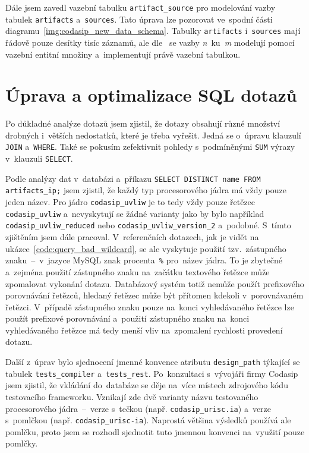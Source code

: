 Dále jsem zavedl vazební tabulku \texttt{artifact\_source} pro modelování vazby tabulek \texttt{artifacts}
a~\texttt{sources}. Tato úprava lze pozorovat ve~spodní části diagramu~\ref{img:codasip_new_data_schema}. Tabulky
\texttt{artifacts} i~\texttt{sources} mají řádově pouze desítky tisíc záznamů, ale
dle~\cite{ModellingBusinessInformationEntityRelationship} se vazby \textit{n}~ku~\textit{m} modelují pomocí vazební
entitní množiny a~implementují právě vazební tabulkou.



\section{Úprava a optimalizace SQL dotazů}
\label{section:uprava_a_optimalizace_SQL_dotazu}
Po důkladné analýze dotazů jsem zjistil, že dotazy obsahují různé množství drobných i~větších nedostatků, které je
třeba vyřešit. Jedná se o~úpravu klauzulí \texttt{JOIN} a~\texttt{WHERE}. Také se pokusím zefektivnit pohledy
s~podmíněnými \texttt{SUM} výrazy v~klauzuli \texttt{SELECT}.

Podle analýzy dat v~databázi a~příkazu \texttt{SELECT DISTINCT name FROM artifacts\_ip;} jsem zjistil, že každý typ procesorového jádra má vždy pouze jeden název. Pro jádro \texttt{codasip\_uvliw} je to tedy vždy pouze řetězec \texttt{codasip\_uvliw} a~nevyskytují se žádné varianty jako by bylo například \texttt{codasip\_uvliw\_reduced} nebo \texttt{codasip\_uvliw\_version\_2} a~podobné. S~tímto zjištěním jsem dále pracoval.
V~referenčních dotazech, jak je vidět na ukázce~\ref{code:query_bad_wildcard}, se ale vyskytuje použití
tzv.~zástupného znaku~--~v~jazyce MySQL znak procenta~\texttt{\%} pro~název jádra. To je zbytečné a~zejména použití
zástupného znaku na~začátku textového řetězce může zpomalovat vykonání dotazu. Databázový systém totiž nemůže
použít prefixového porovnávání řetězců, hledaný řetězec může být přítomen kdekoli v~porovnávaném řetězci. V~případě
zástupného znaku pouze na~konci vyhledávaného řetězce lze použít prefixové porovnávání a~použití zástupného znaku
na~konci vyhledávaného řetězce má tedy menší vliv na~zpomalení rychlosti provedení dotazu.

Další z~úprav bylo sjednocení jmenné konvence atributu \texttt{design\_path} týkající se tabulek \texttt{tests\_compiler}
a~\texttt{tests\_rest}. Po~konzultaci s~vývojáři firmy Codasip jsem zjistil, že vkládání do~databáze se děje na~více
místech zdrojového kódu testovacího frameworku. Vznikají zde dvě varianty názvu testovaného procesorového
jádra~--~verze s~tečkou (např. \texttt{codasip\_urisc.ia}) a~verze s~pomlčkou (např. \texttt{codasip\_urisc-ia}).
Naprostá většina výsledků používá ale pomlčku, proto jsem se rozhodl sjednotit tuto jmennou konvenci na~využití pouze pomlčky.\vfill

